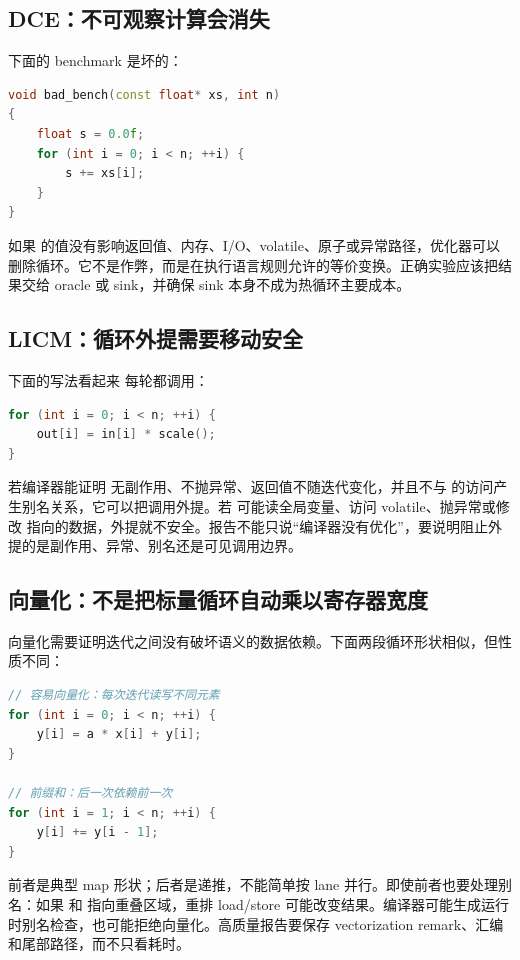\subsection{DCE：不可观察计算会消失}

下面的 benchmark 是坏的：

\begin{lstlisting}[language=C++,caption={结果不被消费的 benchmark}]
void bad_bench(const float* xs, int n)
{
    float s = 0.0f;
    for (int i = 0; i < n; ++i) {
        s += xs[i];
    }
}
\end{lstlisting}

如果  的值没有影响返回值、内存、I/O、volatile、原子或异常路径，优化器可以删除循环。它不是作弊，而是在执行语言规则允许的等价变换。正确实验应该把结果交给 oracle 或 sink，并确保 sink 本身不成为热循环主要成本。

\subsection{LICM：循环外提需要移动安全}

下面的写法看起来  每轮都调用：

\begin{lstlisting}[language=C++]
for (int i = 0; i < n; ++i) {
    out[i] = in[i] * scale();
}
\end{lstlisting}

若编译器能证明  无副作用、不抛异常、返回值不随迭代变化，并且不与  的访问产生别名关系，它可以把调用外提。若  可能读全局变量、访问 volatile、抛异常或修改  指向的数据，外提就不安全。报告不能只说“编译器没有优化”，要说明阻止外提的是副作用、异常、别名还是可见调用边界。

\subsection{向量化：不是把标量循环自动乘以寄存器宽度}

向量化需要证明迭代之间没有破坏语义的数据依赖。下面两段循环形状相似，但性质不同：

\begin{lstlisting}[language=C++]
// 容易向量化：每次迭代读写不同元素
for (int i = 0; i < n; ++i) {
    y[i] = a * x[i] + y[i];
}

// 前缀和：后一次依赖前一次
for (int i = 1; i < n; ++i) {
    y[i] += y[i - 1];
}
\end{lstlisting}

前者是典型 map 形状；后者是递推，不能简单按 lane 并行。即使前者也要处理别名：如果  和  指向重叠区域，重排 load/store 可能改变结果。编译器可能生成运行时别名检查，也可能拒绝向量化。高质量报告要保存 vectorization remark、汇编和尾部路径，而不只看耗时。


